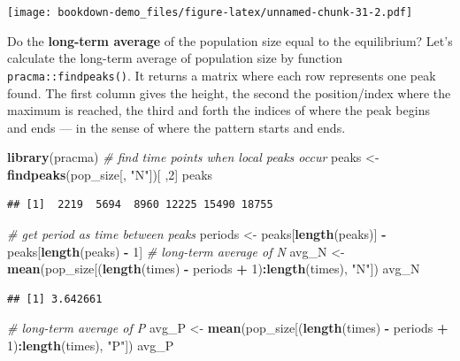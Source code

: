 \documentclass[
]{book}
\newenvironment{Shaded}{\begin{snugshade}}{\end{snugshade}}
\newcommand{\CommentTok}[1]{\textcolor[rgb]{0.56,0.35,0.01}{\textit{#1}}}
\newcommand{\DecValTok}[1]{\textcolor[rgb]{0.00,0.00,0.81}{#1}}
\newcommand{\KeywordTok}[1]{\textcolor[rgb]{0.13,0.29,0.53}{\textbf{#1}}}
\newcommand{\NormalTok}[1]{#1}
\newcommand{\OperatorTok}[1]{\textcolor[rgb]{0.81,0.36,0.00}{\textbf{#1}}}
\newcommand{\StringTok}[1]{\textcolor[rgb]{0.31,0.60,0.02}{#1}}
\begin{document}
\texttt{[image: bookdown-demo\_files/figure-latex/unnamed-chunk-31-2.pdf]}

Do the \textbf{long-term average} of the population size equal to the equilibrium? Let's calculate the long-term average of population size by function \texttt{pracma::findpeaks()}. It returns a matrix where each row represents one peak found. The first column gives the height, the second the position/index where the maximum is reached, the third and forth the indices of where the peak begins and ends --- in the sense of where the pattern starts and ends.

\begin{Shaded}
\begin{Highlighting}[]
\KeywordTok{library}\NormalTok{(pracma)}
\CommentTok{# find time points when local peaks occur}
\NormalTok{peaks <-}\StringTok{ }\KeywordTok{findpeaks}\NormalTok{(pop_size[, }\StringTok{"N"}\NormalTok{])[ ,}\DecValTok{2}\NormalTok{]}
\NormalTok{peaks }
\end{Highlighting}
\end{Shaded}

\begin{verbatim}
## [1]  2219  5694  8960 12225 15490 18755
\end{verbatim}

\begin{Shaded}
\begin{Highlighting}[]
\CommentTok{# get period as time between peaks }
\NormalTok{periods <-}\StringTok{ }\NormalTok{peaks[}\KeywordTok{length}\NormalTok{(peaks)] }\OperatorTok{-}\StringTok{ }\NormalTok{peaks[}\KeywordTok{length}\NormalTok{(peaks) }\OperatorTok{-}\StringTok{ }\DecValTok{1}\NormalTok{]}
\CommentTok{# long-term average of N}
\NormalTok{avg_N <-}\StringTok{ }\KeywordTok{mean}\NormalTok{(pop_size[(}\KeywordTok{length}\NormalTok{(times) }\OperatorTok{-}\StringTok{ }\NormalTok{periods }\OperatorTok{+}\StringTok{ }\DecValTok{1}\NormalTok{)}\OperatorTok{:}\KeywordTok{length}\NormalTok{(times), }\StringTok{"N"}\NormalTok{])}
\NormalTok{avg_N}
\end{Highlighting}
\end{Shaded}

\begin{verbatim}
## [1] 3.642661
\end{verbatim}

\begin{Shaded}
\begin{Highlighting}[]
\CommentTok{# long-term average of P}
\NormalTok{avg_P <-}\StringTok{ }\KeywordTok{mean}\NormalTok{(pop_size[(}\KeywordTok{length}\NormalTok{(times) }\OperatorTok{-}\StringTok{ }\NormalTok{periods }\OperatorTok{+}\StringTok{ }\DecValTok{1}\NormalTok{)}\OperatorTok{:}\KeywordTok{length}\NormalTok{(times), }\StringTok{"P"}\NormalTok{])}
\NormalTok{avg_P}
\end{Highlighting}
\end{Shaded}
\end{document}
